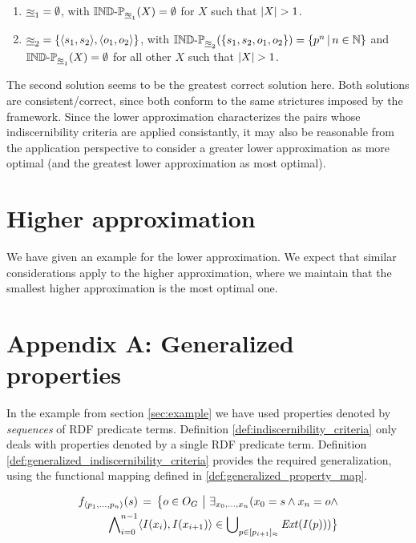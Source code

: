 \documentclass[a4paper]{article}
\begin{document}
\begin{enumerate}
\item $\underline{\approx}_1 = \emptyset$,
      with $\operatorname{{\mathbb{IND}-\mathbb{P}}}_{\underline{\approx}_1}(X) = \emptyset$
      for $X$ such that $\lvert X\rvert > 1$.
\item $\underline{\approx}_2 = \{\langle s_1,s_2\rangle,\langle o_1,o_2\rangle\}$,
      with $\operatorname{{\mathbb{IND}-\mathbb{P}}}_{\underline{\approx}_2}(\{s_1,s_2,o_1,o_2\}) = \{p^n\,\vert\,n \in \mathbb{N}\}$
      and $\operatorname{{\mathbb{IND}-\mathbb{P}}}_{\underline{\approx}_1}(X) = \emptyset$
      for all other $X$ such that $\lvert X\rvert > 1$.
\end{enumerate}

The second solution seems to be the greatest correct solution here.
Both solutions are consistent/correct,
  since both conform to the same strictures imposed by the framework.
Since the lower approximation characterizes the pairs
  whose indiscernibility criteria are applied consistantly,
  it may also be reasonable from the application perspective to
  consider a greater lower approximation as more optimal
  (and the greatest lower approximation as most optimal).

\section{Higher approximation}

We have given an example for the lower approximation.
We expect that similar considerations apply to the higher approximation,
  where we maintain that the smallest higher approximation is
  the most optimal one.

\section{Appendix A: Generalized properties}

In the example from section \ref{sec:example} we have used
  properties denoted by \emph{sequences} of RDF predicate terms.
Definition \ref{def:indiscernibility_criteria} only deals with properties
  denoted by a single RDF predicate term.
Definition \ref{def:generalized_indiscernibility_criteria}
  provides the required generalization,
  using the functional mapping
  defined in \ref{def:generalized_property_map}.

\small
\begin{definition}
\begin{align}
\label{def:generalized_property_map}
  f_{\langle p_1,\ldots,p_n\rangle}(s)
\,=\,
  \big\{o \in O_G\,\,\big\vert\,\,
    \exists_{x_0,\ldots,x_n}(
      x_0 = s \land x_n = o \land\nonumber\\
      \bigwedge_{i=0}^{n-1}\nolimits
          \langle I(x_i),I(x_{i+1})\rangle
        \in
          \bigcup_{p \in [p_{i+1}]_{\approx}}\nolimits \mathit{Ext}(I(p))
    )
  \big\}\nonumber
\end{align}
\end{definition}
\normalsize
\end{document}
